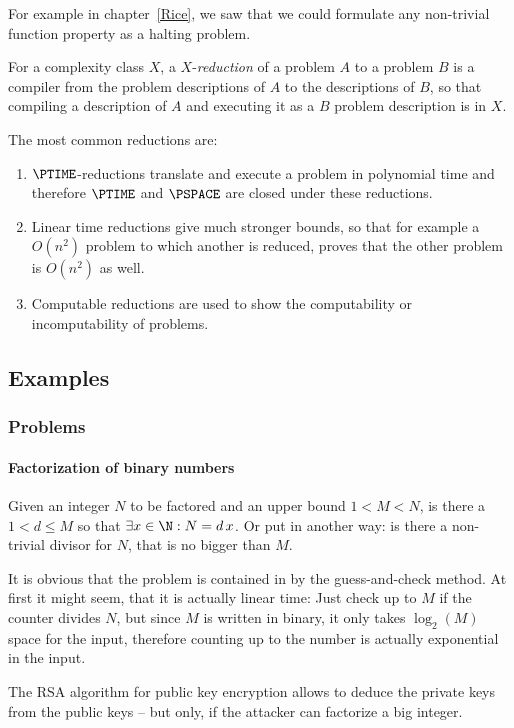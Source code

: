 For example in chapter~\ref{Rice}, we saw that we could formulate any 
non-trivial function property as a halting problem.

\begin{defn}
	For a complexity class $X$, a $X$-\emph{reduction} of a problem $A$ to a
	problem $B$ is a compiler from the problem descriptions of $A$ to the 
	descriptions of $B$, so that compiling a description of $A$ and executing 
	it as a $B$ problem description is in $X$.
\end{defn}

\begin{example}
	The most common reductions are:
	\begin{enumerate}
		\item $\PTIME$-reductions translate and execute a problem in polynomial 
			time and therefore $\PTIME$ and $\PSPACE$ are closed under these reductions.
		\item Linear time reductions give much stronger bounds, so that for example
			a $O(n^2)$ problem to which another is reduced, proves that the other 
			problem is $O(n^2)$ as well.
		\item Computable reductions are used to show the computability or 
			incomputability of problems.
	\end{enumerate}
\end{example}

\subsection{Examples}
\subsubsection{Problems}
\paragraph{Factorization of binary numbers}
Given an integer $N$ to be factored and an upper bound $1<M<N$, is there a 
$1<d\leq M$ so that $\exists x\in \N: N = d\,x$. Or put in another way: is 
there a non-trivial divisor for $N$, that is no bigger than $M$.

It is obvious that the problem is contained in \NPTIME by the guess-and-check 
method. At first it might seem, that it is actually linear time: Just check 
up to $M$ if the counter divides $N$, but since $M$ is written in binary, it 
only takes $\log_2(M)$ space for the input, therefore counting up to the 
number is actually exponential in the input.
\begin{example}[Relevance] 
	The RSA algorithm for
	public key encryption allows to deduce the private
	keys from the public keys -- but only, if the
	attacker can factorize a big integer.
\end{example}

